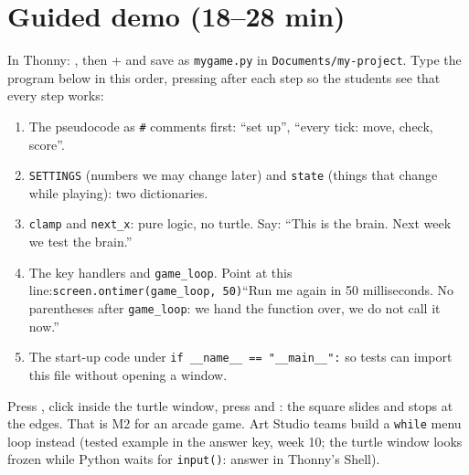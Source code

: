 \section{Guided demo (18--28 min)}
\begin{workedexample}
In Thonny: , then + and save as \texttt{mygame.py} in
\texttt{Documents/my-project}. Type the program below in this order, pressing  after each
step so the students see that every step works:
\begin{enumerate}
  \item The pseudocode as \texttt{\#} comments first: \enquote{set up}, \enquote{every tick: move, check, score}.
  \item \texttt{SETTINGS} (numbers we may change later) and \texttt{state} (things that change while playing): two dictionaries.
  \item \texttt{clamp} and \texttt{next\_x}: pure logic, no turtle. Say: \enquote{This is the brain. Next week we test the brain.}
  \item The key handlers and \texttt{game\_loop}. Point at this line:\newline \texttt{screen.ontimer(game\_loop, 50)}\newline \enquote{Run me again in 50 milliseconds. No parentheses after \texttt{game\_loop}: we hand the function over, we do not call it now.}
  \item The start-up code under \texttt{if \_\_name\_\_ == "\_\_main\_\_":} so tests can import this file without opening a window.
\end{enumerate}
Press , click inside the turtle window, press  and : the square slides and
stops at the edges. That is M2 for an arcade game. Art Studio teams build a \texttt{while} menu loop
instead (tested example in the answer key, week 10; the turtle window looks frozen while Python waits
for \texttt{input()}: answer in Thonny's Shell).
\end{workedexample}

